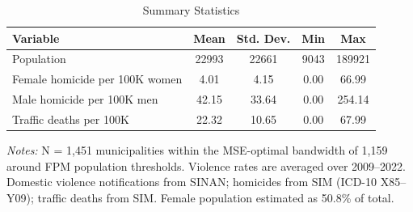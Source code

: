 \begin{table}[H]
\centering
\caption{Summary Statistics}
\begin{threeparttable}
\begin{tabular}{lcccc}
\toprule
Variable & Mean & Std. Dev. & Min & Max \\
\midrule
Population & 22993 & 22661 & 9043 & 189921 \\
Female homicide per 100K women & 4.01 & 4.15 & 0.00 & 66.99 \\
Male homicide per 100K men & 42.15 & 33.64 & 0.00 & 254.14 \\
Traffic deaths per 100K & 22.32 & 10.65 & 0.00 & 67.99 \\
\bottomrule
\end{tabular}
\begin{tablenotes}[flushleft]
\small
\item \textit{Notes:} N = 1,451 municipalities within the MSE-optimal bandwidth of 1,159 around FPM population thresholds. Violence rates are averaged over 2009--2022. Domestic violence notifications from SINAN; homicides from SIM (ICD-10 X85--Y09); traffic deaths from SIM. Female population estimated as 50.8\% of total.
\end{tablenotes}
\end{threeparttable}
\label{tab:summary}
\end{table}

